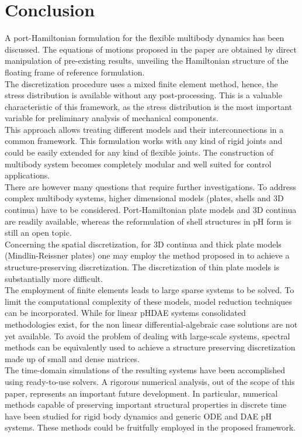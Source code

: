 \documentclass{svjour3}                     %
\newcommand{\firstRev}[1]{\textcolor{red!80!black}{#1}}
\begin{document}
	\section{Conclusion}
	A port-Hamiltonian formulation for the flexible multibody dynamics has been discussed. \firstRev{The equations of motions proposed in the paper  are obtained by direct manipulation of pre-existing results, unveiling the Hamiltonian structure of the floating frame of reference formulation.} \\
	\indent The discretization procedure uses a mixed finite element method, hence, the stress distribution is available without any post-processing. This is a valuable characteristic of this framework, as the stress distribution is the most important variable for preliminary analysis of mechanical components. \\
	\indent \firstRev{This approach allows treating different models and their interconnections in a common framework. This formulation works with any kind of rigid joints and could be easily extended for any kind of flexible joints.} The construction of multibody system becomes completely modular and well suited for control applications.  \\
	
	\firstRev{There are however many questions that require further investigations. To address complex multibody systems, higher dimensional models (plates, shells and 3D continua) have to be considered. Port-Hamiltonian plate models and 3D continua are readily available, whereas the reformulation of shell structures in pH form is still an open topic. \\
		\indent Concerning the spatial discretization, for 3D continua and thick plate models (Mindlin-Reissner plates) one may employ the method proposed in \cite{cohen2005} to achieve a structure-preserving discretization. The discretization of thin plate models is substantially more difficult. \\ 
		\indent The employment of finite elements leads to large sparse systems to be solved. To limit the computational complexity of these models, model reduction techniques can be incorporated. While for linear pHDAE systems consolidated methodologies exist, for the  non linear differential-algebraic case solutions are not yet available. To avoid the problem of dealing with large-scale systems, spectral methods can be equivalently used to achieve a structure preserving discretization made up of small and dense matrices.  \\ 
		\indent The time-domain simulations of the resulting systems have been accomplished using ready-to-use solvers. A rigorous numerical analysis, out of the scope of this paper, represents an important future development. In particular, numerical methods capable of preserving important structural properties in discrete time have been studied for rigid body dynamics \cite{celledoni2018passivity} and generic ODE \cite{KOTYCZKA_dt} and DAE \cite{mehrmann2019structurepreserving} pH systems. These methods could be fruitfully employed in the proposed framework. }
	
\end{document}
